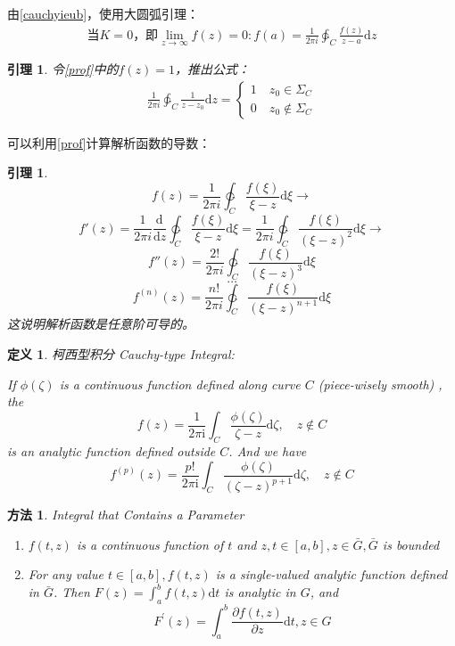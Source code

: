 \documentclass[10pt, a4paper, oneside]{ctexbook}
\newtheorem{definition}[theorem]{定义}
\newtheorem{lemma}[theorem]{引理}
\newtheorem{method}[theorem]{方法}
\def\D{\mathrm{d}}
\newcommand{\F}[1][z]
{\ensuremath{f(#1)}}
\newcommand{\dev}[3][]
{\ensuremath{\frac{\displaystyle \D^{#1} #2}{ \displaystyle \D #3}}}
\begin{document}
由\ref{cauchyieub}，使用大圆弧引理：
\begin{align*}
    \text{当$K=0$，即$\lim_{z\to \infty} f(z) =0$}:
    f(a)=\frac{1}{2\pi i}\ointctrclockwise_C \frac{f(z)}{z-a}\D z
\end{align*}
\begin{lemma}
    令\ref{prof}中的$\F=1$，推出公式：
    \begin{align*}
        \frac{1}{2\pi i}\ointctrclockwise_C \frac{1}{z-z_0} \D z=
        \begin{cases}
            1\quad z_0\in \Sigma_C \\
            0\quad z_0\notin \Sigma_C
        \end{cases}
    \end{align*}
\end{lemma}
可以利用\ref{prof}计算解析函数的导数：
\begin{lemma}
    \label{method283}
    $$
        \F = \frac{1}{2\pi i}\ointctrclockwise_C \frac{\F[\xi]}{\xi-z}\D \xi \to
    $$
    $$
        f'(z)=\frac{1}{2\pi i} \dev{}{z}\ointctrclockwise_C \frac{\F[\xi]}{\xi - z}\D \xi= \frac{1}{2\pi i}\ointctrclockwise_C \frac{\F[\xi]}{(\xi-z)^2}\D \xi \to
    $$
    $$
        f''(z)=\frac{2!}{2\pi i}\ointctrclockwise_C \frac{\F[\xi]}{(\xi-z)^3}\D \xi
    $$
    $$\dots$$
    $$
        f^{(n)}(z)=\frac{n!}{2\pi i}\ointctrclockwise_C \frac{\F[\xi]}{(\xi-z)^{n+1}}\D \xi
    $$
    这说明解析函数是任意阶可导的。
\end{lemma}
\begin{definition}
    柯西型积分 Cauchy-type Integral:
    \rm

    If $\phi(\zeta)$ is a continuous function defined along curve $C$ (piece-wisely smooth) , the
    $$f(z)=\frac{1}{2 \pi \mathrm{i}} \int_{C} \frac{\phi(\zeta)}{\zeta-z} \D \zeta, \quad z \notin C $$
    is an analytic function defined outside $C$. And we have
    $$f^{(p)}(z)=\frac{p !}{2 \pi \mathrm{i}} \int_{C} \frac{\phi(\zeta)}{(\zeta-z)^{p+1}} \D \zeta, \quad z \notin C$$
\end{definition}
\begin{method}
    Integral that Contains a Parameter
    \begin{enumerate}
        \rm
        \item $f(t, z)$ is a continuous function of $t$ and $z, t \in[a, b], z \in \bar{G}, \bar{G}$ is bounded
        \item  For any value $t \in[a, b], f(t, z)$ is a single-valued analytic function defined in $\bar{G}$.
              Then $\displaystyle F(z)=\int_{a}^{b} f(t, z) \D t$ is analytic in $G$, and
              $$F^{\prime}(z)=\int_{a}^{b} \frac{\partial f(t, z)}{\partial z} \D t, z \in G$$
    \end{enumerate}
\end{method}
\end{document}
